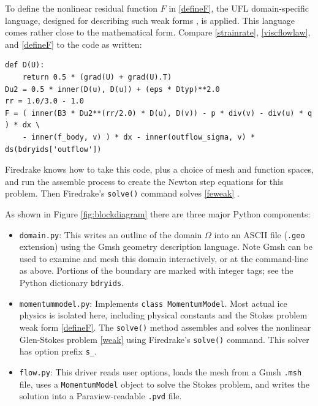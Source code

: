 \documentclass[letterpaper,final,12pt,reqno]{amsart}
\begin{document}
To define the nonlinear residual function $F$ in \eqref{defineF}, the UFL domain-specific language, designed for describing such weak forms \cite{Alnaesetal2014}, is applied.  This language comes rather close to the mathematical form.  Compare \eqref{strainrate}, \eqref{viscflowlaw}, and \eqref{defineF} to the code as written:
\begin{Verbatim}[fontsize=\small,frame=lines]
def D(U):
    return 0.5 * (grad(U) + grad(U).T)
Du2 = 0.5 * inner(D(u), D(u)) + (eps * Dtyp)**2.0
rr = 1.0/3.0 - 1.0
F = ( inner(B3 * Du2**(rr/2.0) * D(u), D(v)) - p * div(v) - div(u) * q ) * dx \
    - inner(f_body, v) ) * dx - inner(outflow_sigma, v) * ds(bdryids['outflow'])
\end{Verbatim}
Firedrake knows how to take this code, plus a choice of mesh and function spaces, and run the assemble process to create the Newton step equations for this problem.  Then Firedrake's \texttt{solve()} command solves \eqref{feweak} \cite{Rathgeberetal2016}.

\medskip
As shown in Figure \ref{fig:blockdiagram} there are three major Python components:
\begin{itemize}
\item \texttt{domain.py}: \quad  This writes an outline of the domain $\Omega$ into an ASCII file (\texttt{.geo} extension) using the Gmsh \cite{GeuzaineRemacle2009} geometry description language.  Note Gmsh can be used to examine and mesh this domain interactively, or at the command-line as above.  Portions of the boundary are marked with integer tags; see the Python dictionary \texttt{bdryids}.

\item \texttt{momentummodel.py}: \quad  Implements \texttt{class MomentumModel}.  Most actual ice physics is isolated here, including physical constants and the Stokes problem weak form \eqref{defineF}.  The \texttt{solve()} method assembles and solves the nonlinear Glen-Stokes problem \eqref{weak} using Firedrake's \texttt{solve()} command.  This solver has option prefix \texttt{s\_}.

\item \texttt{flow.py}: \quad  This driver reads user options, loads the mesh from a Gmsh \texttt{.msh} file, uses a \texttt{MomentumModel} object to solve the Stokes problem, and writes the solution into a Paraview-readable \texttt{.pvd} file.
\end{itemize}
\end{document}
